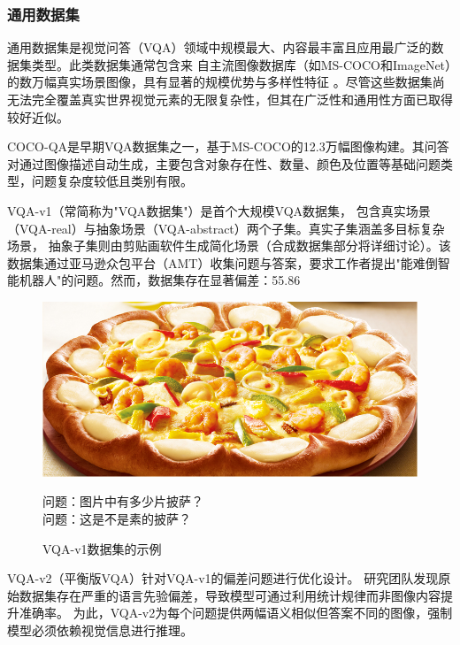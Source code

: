 \subsubsection{通用数据集}
通用数据集是视觉问答（VQA）领域中规模最大、内容最丰富且应用最广泛的数据集类型。此类数据集通常包含来
自主流图像数据库（如MS-COCO\cite{lin2014microsoft}和ImageNet\cite{deng2009imagenet}）的数万幅真实场景图像，具有显著的规模优势与多样性特征
。尽管这些数据集尚无法完全覆盖真实世界视觉元素的无限复杂性，但其在广泛性和通用性方面已取得较好近似。

COCO-QA是早期VQA数据集之一，基于MS-COCO的12.3万幅图像构建。其问答对通过图像描述自动生成，主要包含对象存在性、数量、颜色及位置等基础问题类型，问题复杂度较低且类别有限。

VQA-v1\cite{Antol2015VQA}（常简称为"VQA数据集"）是首个大规模VQA数据集，
包含真实场景（VQA-real）与抽象场景（VQA-abstract）两个子集。真实子集涵盖多目标复杂场景，
抽象子集则由剪贴画软件生成简化场景（合成数据集部分将详细讨论）。该数据集通过亚马逊众包平台（AMT）收集问题与答案，要求工作者提出"能难倒智能机器人"的问题。然而，数据集存在显著偏差：55.86%

\begin{figure}
    \centering
    \includegraphics[scale=0.4]{figures/example-from-vqa-v1.jpg}
    \begin{center}
        \footnotesize 问题：图片中有多少片披萨？\\
        \footnotesize 问题：这是不是素的披萨？
    \end{center}
    \caption{VQA-v1数据集的示例}
    \label{fig:example-from-vqa-v1}
\end{figure}

VQA-v2\cite{goyal2017making}（平衡版VQA）针对VQA-v1的偏差问题进行优化设计。
研究团队发现原始数据集存在严重的语言先验偏差，导致模型可通过利用统计规律而非图像内容提升准确率。
为此，VQA-v2为每个问题提供两幅语义相似但答案不同的图像，强制模型必须依赖视觉信息进行推理。

